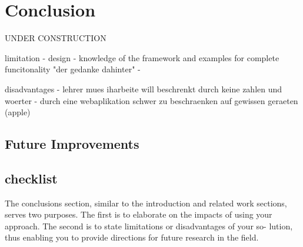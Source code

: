 
\chapter{Conclusion}
\label{chap:conclusion}
UNDER CONSTRUCTION

limitation
- design
- knowledge of the framework and examples for complete funcitonality "der gedanke dahinter"
-

disadvantages
- lehrer mues iharbeite will beschrenkt durch keine zahlen und woerter
- durch eine webaplikation schwer zu beschraenken auf gewissen geraeten (apple)


\section{Future Improvements}

\section{checklist}
The conclusions section, similar to the introduction and
related work sections, serves two purposes. The first is
to elaborate on the impacts of using your approach. The
second is to state limitations or disadvantages of your so-
lution, thus enabling you to provide directions for future
research in the field.
